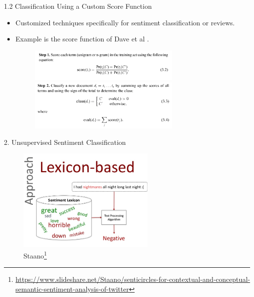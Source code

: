 \documentclass[xcolor=table]{beamer}
\begin{document}
\begin{frame}{1.2 Classification Using a Custom Score Function}
    \begin{itemize}
        \item Customized techniques specifically for sentiment classification or reviews.
    
        \item Example is the score function of Dave et al \cite{dave2003mining}. \\
        
        \begin{figure}
            \centering
            \includegraphics[width=0.7\textwidth]{img/funcs-1.PNG} \hfill
            \includegraphics[width=0.7\textwidth]{img/funcs-2.PNG}
        \end{figure}
        
        
    \end{itemize}
\end{frame}


\begin{frame}{2. Unsupervised Sentiment Classification}
    \begin{figure}
        \centering
        \includegraphics[width=0.6\textwidth]{img/lexi1.jpg}
        \caption{ Staano\footnote{\url{https://www.slideshare.net/Staano/senticircles-for-contextual-and-conceptual-semantic-sentiment-analysis-of-twitter}}}
    \end{figure}
\end{frame}
\end{document}
